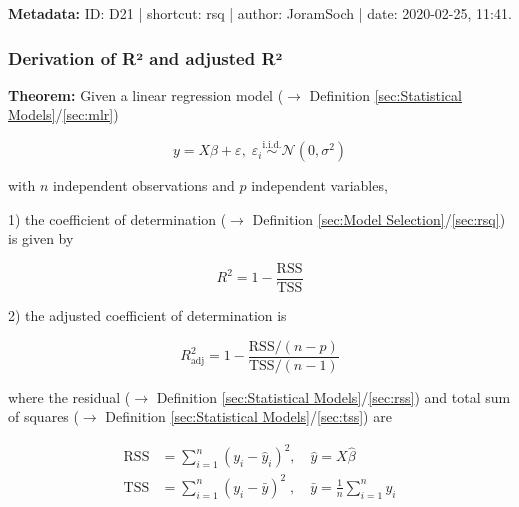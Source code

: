 \documentclass[a4paper,12pt,twoside]{book}
\begin{document}
\vspace{1em}
\textbf{Metadata:} ID: D21 | shortcut: rsq | author: JoramSoch | date: 2020-02-25, 11:41.
\vspace{1em}



\subsubsection[\textbf{Derivation of R² and adjusted R²}]{Derivation of R² and adjusted R²} \label{sec:rsq-der}
\setcounter{equation}{0}

\textbf{Theorem:} Given a linear regression model ($\rightarrow$ Definition \ref{sec:Statistical Models}/\ref{sec:mlr})

\begin{equation} \label{eq:rsq-der-rsq-mlr}
y = X\beta + \varepsilon, \; \varepsilon_i \overset{\mathrm{i.i.d.}}{\sim} \mathcal{N}(0, \sigma^2)
\end{equation}

with $n$ independent observations and $p$ independent variables,

1) the coefficient of determination ($\rightarrow$ Definition \ref{sec:Model Selection}/\ref{sec:rsq}) is given by

\begin{equation} \label{eq:rsq-der-R2}
R^2 = 1 - \frac{\mathrm{RSS}}{\mathrm{TSS}}
\end{equation}

2) the adjusted coefficient of determination is

\begin{equation} \label{eq:rsq-der-R2-adj}
R^2_{\mathrm{adj}} = 1 - \frac{\mathrm{RSS}/(n-p)}{\mathrm{TSS}/(n-1)}
\end{equation}

where the residual ($\rightarrow$ Definition \ref{sec:Statistical Models}/\ref{sec:rss}) and total sum of squares ($\rightarrow$ Definition \ref{sec:Statistical Models}/\ref{sec:tss}) are

\begin{equation} \label{eq:rsq-der-SS}
\begin{split}
\mathrm{RSS} &= \sum_{i=1}^{n} (y_i - \hat{y}_i)^2, \quad \hat{y} = X\hat{\beta} \\
\mathrm{TSS} &= \sum_{i=1}^{n} (y_i - \bar{y})^2\;, \quad \bar{y} = \frac{1}{n} \sum_{i=1}^n y_i \\
\end{split}
\end{equation}
\end{document}
